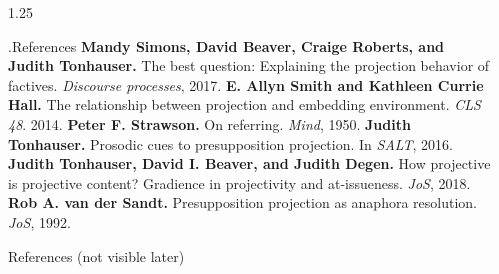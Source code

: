 \documentclass[final, table]{beamer}
\newlength{\sepwidth}
\newlength{\colwidth}
\newcommand{\separatorcolumn}{\begin{column}{\sepwidth}\end{column}}
\begin{document}
\begin{frame}[t]
\begin{columns}[t]
\begin{column}{1.25\colwidth}
\begin{normalbox}{\phantom.\hfill References}
				\textbf{Mandy Simons, David Beaver, Craige Roberts, and Judith Tonhauser.} The best question: Explaining the projection behavior of factives. \textit{Discourse processes}, 2017.\quad\textbullet\quad
				\textbf{E. Allyn Smith and Kathleen Currie Hall.} The relationship between projection and embedding environment. \textit{CLS 48}. 2014.\quad\textbullet\quad
				\textbf{Peter F. Strawson.} On referring. \textit{Mind}, 1950.\quad\textbullet\quad
				\textbf{Judith Tonhauser.} Prosodic cues to presupposition projection. In \textit{SALT}, 2016.\quad\textbullet\quad
				\textbf{Judith Tonhauser, David I. Beaver, and Judith Degen.} How projective is projective content? Gradience in projectivity and at-issueness. \textit{JoS}, 2018.\quad\textbullet\quad
				\textbf{Rob A. van der Sandt.} Presupposition projection as anaphora resolution. \textit{JoS}, 1992.

			\end{normalbox}

			\vspace{20\baselineskip}
			\begin{normalbox}{References (not visible later)}
				
				
			\end{normalbox}

		\end{column}
		\separatorcolumn
	\end{columns}



\end{frame}
\end{document}
